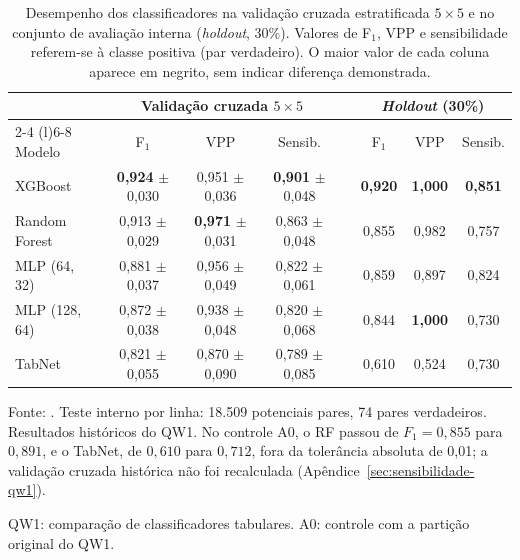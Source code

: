 \begin{table}[htbp]
\centering
\caption{Desempenho dos classificadores na validação cruzada estratificada $5 \times 5$
  e no conjunto de avaliação interna (\textit{holdout}, 30\%).
  Valores de F$_1$, VPP e sensibilidade referem-se à classe positiva (par verdadeiro).
  O maior valor de cada coluna aparece em negrito, sem indicar diferença demonstrada.}
\label{tab:qw1-deep-learning}
\small
\begin{tabular}{@{}l ccc c ccc@{}}
\toprule
& \multicolumn{3}{c}{Validação cruzada $5 \times 5$}
& & \multicolumn{3}{c}{\textit{Holdout} (30\%)} \\
\cmidrule(lr){2-4} \cmidrule(l){6-8}
Modelo & F$_1$ & VPP & Sensib. & & F$_1$ & VPP & Sensib. \\
\midrule
XGBoost           & \textbf{0,924} $\pm$ 0,030 & 0,951 $\pm$ 0,036 & \textbf{0,901} $\pm$ 0,048
                  && \textbf{0,920} & \textbf{1,000} & \textbf{0,851} \\
Random Forest     & 0,913 $\pm$ 0,029 & \textbf{0,971} $\pm$ 0,031 & 0,863 $\pm$ 0,048
                  && 0,855 & 0,982 & 0,757 \\
MLP (64, 32)      & 0,881 $\pm$ 0,037 & 0,956 $\pm$ 0,049 & 0,822 $\pm$ 0,061
                  && 0,859 & 0,897 & 0,824 \\
MLP (128, 64)     & 0,872 $\pm$ 0,038 & 0,938 $\pm$ 0,048 & 0,820 $\pm$ 0,068
                  && 0,844 & \textbf{1,000} & 0,730 \\
TabNet            & 0,821 $\pm$ 0,055 & 0,870 $\pm$ 0,090 & 0,789 $\pm$ 0,085
                  && 0,610 & 0,524 & 0,730 \\
\bottomrule
\end{tabular}
\par\footnotesize Fonte: . Teste interno por linha: 18.509 potenciais pares, 74 pares verdadeiros. Resultados históricos do QW1. No controle A0, o RF passou de $F_1=0{,}855$ para $0{,}891$, e o TabNet, de $0{,}610$ para $0{,}712$, fora da tolerância absoluta de 0,01; a validação cruzada histórica não foi recalculada (Apêndice~\ref{sec:sensibilidade-qw1}).
\par\footnotesize QW1: comparação de classificadores tabulares. A0: controle com a partição original do QW1.
\end{table}
